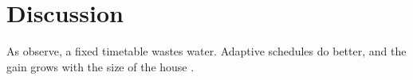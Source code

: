 \section{Discussion}
As \textcite{verhoeven19} observe, a fixed timetable wastes water. Adaptive
schedules \autocite{lund21} do better, and the gain grows with the size of the
house \autocite[chapter~4]{verhoeven19}.
